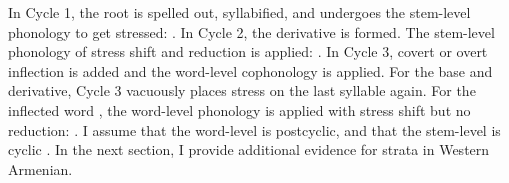 In Cycle 1, the root is spelled out, syllabified, and undergoes the stem-level phonology to get stressed: \textit{}. In Cycle 2, the derivative is formed. The stem-level phonology of stress shift and reduction is applied: \textit{}. In Cycle 3, covert or overt inflection is added and the word-level cophonology is applied. For the base and derivative, Cycle 3   vacuously places stress on the last syllable again. For the inflected word \textit{}, the word-level phonology is applied with stress shift but no reduction: \textit{}.  
I assume that the word-level is postcyclic, and that the stem-level is cyclic  \citep{BooijRubach-1987-PostcyclicPostLexical}. In the next section, I provide additional evidence for strata in Western Armenian.%






			
			
				
				
			
